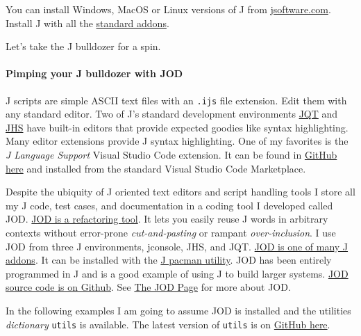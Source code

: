 You can install Windows, MacOS or Linux versions of J from
\href{https://www.jsoftware.com/\#/}{jsoftware.com}. Install J with all
the \href{https://code.jsoftware.com/wiki/Pacman}{standard addons}.

Let's take the J bulldozer for a spin.

    \hypertarget{pimping-your-j-bulldozer-with-jod}{%
\paragraph{Pimping your J bulldozer with
JOD}\label{pimping-your-j-bulldozer-with-jod}}

    J scripts are simple ASCII text files with an \texttt{.ijs} file
extension. Edit them with any standard editor. Two of J's standard
development environments
\href{https://code.jsoftware.com/wiki/Guides/Qt_IDE}{JQT} and
\href{https://code.jsoftware.com/wiki/Guides/JHS}{JHS} have built-in
editors that provide expected goodies like syntax highlighting. Many
editor extensions provide J syntax highlighting. One of my favorites is
the \emph{J Language Support} Visual Studio Code extension. It can be
found in \href{https://github.com/tikkanz/j-vscode}{GitHub here} and
installed from the standard Visual Studio Code Marketplace.

Despite the ubiquity of J oriented text editors and script handling
tools I store all my J code, test cases, and documentation in a coding
tool I developed called JOD.
\href{https://bakerjd99.files.wordpress.com/2020/11/jod.pdf}{JOD is a
refactoring tool}. It lets you easily reuse J words in arbitrary
contexts without error-prone \emph{cut-and-pasting} or rampant
\emph{over-inclusion}. I use JOD from three J environments, jconsole,
JHS, and JQT.
\href{https://code.jsoftware.com/wiki/Addons/general/jod}{JOD is one of
many J addons}. It can be installed with the
\href{https://code.jsoftware.com/wiki/Pacman}{J pacman utility}. JOD has
been entirely programmed in J and is a good example of using J to build
larger systems. \href{https://github.com/bakerjd99/jod}{JOD source code
is on Github}. See
\href{https://analyzethedatanotthedrivel.org/the-jod-page/}{The JOD
Page} for more about JOD.

In the following examples I am going to assume JOD is installed and the
utilities \emph{dictionary} \texttt{utils} is available. The latest
version of \texttt{utils} is on
\href{https://github.com/bakerjd99/joddumps}{GitHub here}.


